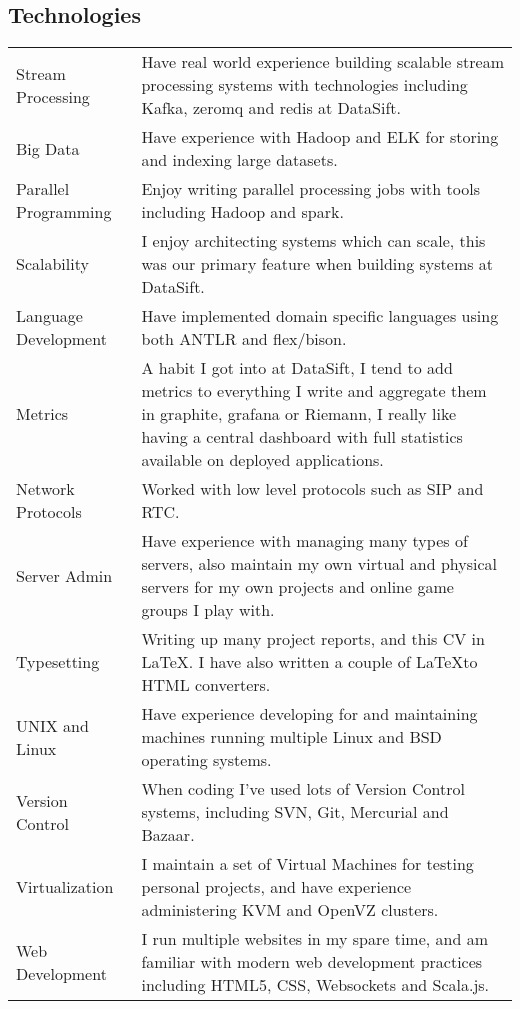 \documentclass[a4paper]{article}
\begin{document}
\subsection*{Technologies}
\begin{tabular}{ l p{11.7cm} }
Stream Processing & Have real world experience building scalable stream processing systems with technologies including Kafka, zeromq and redis at DataSift.\\
Big Data & Have experience with Hadoop and ELK for storing and indexing large datasets.\\
Parallel Programming & Enjoy writing parallel processing jobs with tools including Hadoop and spark.\\
Scalability & I enjoy architecting systems which can scale, this was our primary feature when building systems at DataSift.\\
Language Development & Have implemented domain specific languages using both ANTLR and flex/bison.\\
Metrics & A habit I got into at DataSift, I tend to add metrics to everything I write and aggregate them in graphite, grafana or Riemann, I really like having a central dashboard with full statistics available on deployed applications.\\
Network Protocols & Worked with low level protocols such as SIP and RTC.\\
Server Admin & Have experience with managing many types of servers, also maintain my own virtual and physical servers for my own projects and online game groups I play with.\\
Typesetting & Writing up many project reports, and this CV in \LaTeX. I have also written a couple of \LaTeX to HTML converters.\\
UNIX and Linux & Have experience developing for and maintaining machines running multiple Linux and BSD operating systems.\\
Version Control & When coding I've used lots of Version Control systems, including SVN, Git, Mercurial and Bazaar.\\
Virtualization & I maintain a set of Virtual Machines for testing personal projects, and have experience administering KVM and OpenVZ clusters.\\
Web Development & I run multiple websites in my spare time, and am familiar with modern web development practices including HTML5, CSS, Websockets and Scala.js.\\
\end{tabular}
\end{document}
